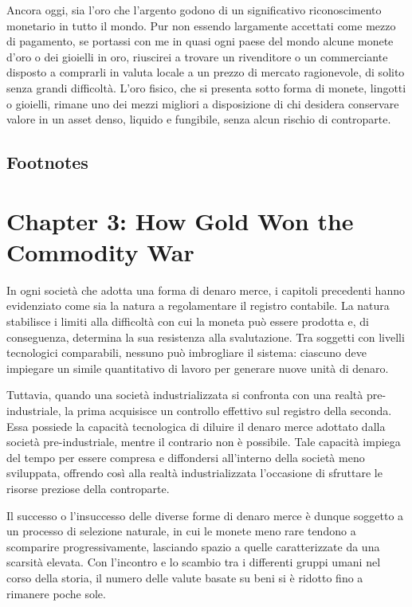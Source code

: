 \documentclass[
  a5paper,
  smalldemyvopaper,10pt,twoside,onecolumn,openright,extrafontsizes,hidelinks]{memoir}
\begin{document}
Ancora oggi, sia l'oro che l'argento godono di un significativo
riconoscimento monetario in tutto il mondo. Pur non essendo largamente
accettati come mezzo di pagamento, se portassi con me in quasi ogni
paese del mondo alcune monete d'oro o dei gioielli in oro, riuscirei a
trovare un rivenditore o un commerciante disposto a comprarli in valuta
locale a un prezzo di mercato ragionevole, di solito senza grandi
difficoltà. L'oro fisico, che si presenta sotto forma di monete,
lingotti o gioielli, rimane uno dei mezzi migliori a disposizione di chi
desidera conservare valore in un asset denso, liquido e fungibile, senza
alcun rischio di controparte.

\section{Footnotes}\label{footnotes-3}


\chapter{\texorpdfstring{Chapter 3: \textbf{How Gold Won the Commodity
War}}{Chapter 3: How Gold Won the Commodity War}}\label{chapter-3-how-gold-won-the-commodity-war}

In ogni società che adotta una forma di denaro merce, i capitoli
precedenti hanno evidenziato come sia la natura a regolamentare il
registro contabile. La natura stabilisce i limiti alla difficoltà con
cui la moneta può essere prodotta e, di conseguenza, determina la sua
resistenza alla svalutazione. Tra soggetti con livelli tecnologici
comparabili, nessuno può imbrogliare il sistema: ciascuno deve impiegare
un simile quantitativo di lavoro per generare nuove unità di denaro.

Tuttavia, quando una società industrializzata si confronta con una
realtà pre-industriale, la prima acquisisce un controllo effettivo sul
registro della seconda. Essa possiede la capacità tecnologica di diluire
il denaro merce adottato dalla società pre-industriale, mentre il
contrario non è possibile. Tale capacità impiega del tempo per essere
compresa e diffondersi all'interno della società meno sviluppata,
offrendo così alla realtà industrializzata l'occasione di sfruttare le
risorse preziose della controparte.

Il successo o l'insuccesso delle diverse forme di denaro merce è dunque
soggetto a un processo di selezione naturale, in cui le monete meno rare
tendono a scomparire progressivamente, lasciando spazio a quelle
caratterizzate da una scarsità elevata. Con l'incontro e lo scambio tra
i differenti gruppi umani nel corso della storia, il numero delle valute
basate su beni si è ridotto fino a rimanere poche sole.
\end{document}
